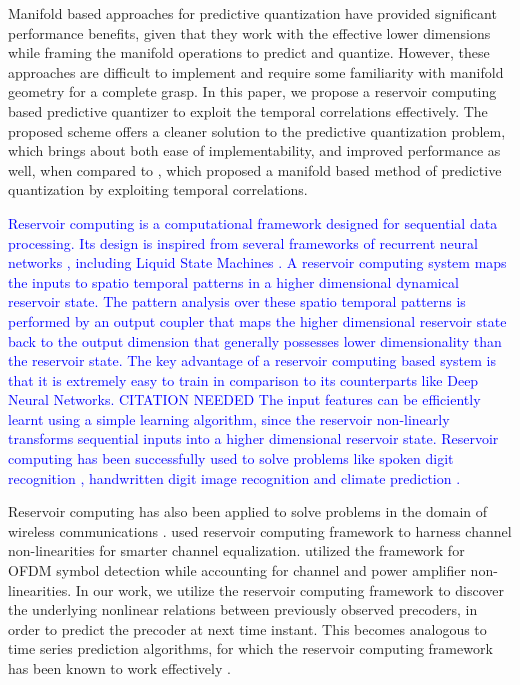 \documentclass[conference]{IEEEtran}
\begin{document}
Manifold based approaches for predictive quantization have provided significant performance benefits, given that they work with the effective lower dimensions while framing the manifold operations to predict and quantize.
However, these approaches are difficult to implement and require some familiarity with manifold geometry for a complete grasp.
In this paper, we propose a reservoir computing based predictive quantizer to exploit the temporal correlations effectively.
The proposed scheme offers a cleaner solution to the predictive quantization problem, which brings about both ease of implementability, and improved performance as well, when compared to \cite{6891198}, which proposed a manifold based method of predictive quantization by exploiting temporal correlations.

\textcolor{blue}{
Reservoir computing is a computational framework designed for sequential data processing.
Its design is inspired from several frameworks of recurrent neural networks \cite{jaeger2004harnessing}, including Liquid State Machines \cite{jalalvand2015real}.
A reservoir computing system maps the inputs to spatio temporal patterns in a higher dimensional dynamical reservoir state.
The pattern analysis over these spatio temporal patterns is performed by an output coupler that maps the higher dimensional reservoir state back to the output dimension that generally possesses lower dimensionality than the reservoir state.
The key advantage of a reservoir computing based system is that it is extremely easy to train in comparison to its counterparts like Deep Neural Networks. CITATION NEEDED
The input features can be efficiently learnt using a simple learning algorithm, since the reservoir non-linearly transforms sequential inputs into a higher dimensional reservoir state.
Reservoir computing has been successfully used to solve problems like spoken digit recognition \cite{verstraeten2005isolated}, handwritten digit image recognition \cite{jalalvand2015real} and climate prediction \cite{pathak2017using}.}

\noindent Reservoir computing has also been applied to solve problems in the domain of wireless communications \cite{jaeger2004harnessing,mosleh2017brain,shafin2018realizing}.
\cite{jaeger2004harnessing} used reservoir computing framework to harness channel non-linearities for smarter channel equalization.
\cite{mosleh2017brain,shafin2018realizing} utilized the framework for OFDM symbol detection while accounting for channel and power amplifier non-linearities.
In our work, we utilize the reservoir computing framework to discover the underlying nonlinear relations between previously observed precoders, in order to predict the precoder at next time instant. This becomes analogous to time series prediction algorithms, for which the reservoir computing framework has been known to work effectively \cite{mosleh2017brain}.
\end{document}
